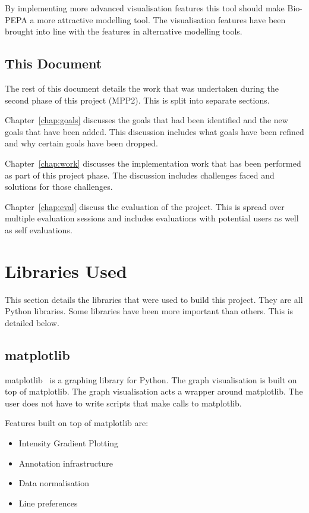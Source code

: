 By implementing more advanced visualisation features this tool should make Bio-PEPA a more attractive modelling tool. The visualisation features have been brought into line with the features in alternative modelling tools.

\subsection{This Document}

The rest of this document details the work that was undertaken during the second phase of this project (MPP2).  This is split into separate sections.

Chapter~\ref{chap:goals} discusses the goals that had been identified and the new goals that have been added.  This discussion includes what goals have been refined and why certain goals have been dropped.

Chapter~\ref{chap:work} discusses the implementation work that has been performed as part of this project phase.  The discussion includes challenges faced and solutions for those challenges.

Chapter~\ref{chap:eval} discuss the evaluation of the project.  This is spread over multiple evaluation sessions and includes evaluations with potential users as well as self evaluations.

\section{Libraries Used}

This section details the libraries that were used to build this project.  They are all Python libraries.  Some libraries have been more important than others.  This is detailed below.

\subsection{matplotlib}

matplotlib~\cite{mpl} is a graphing library for Python.  The graph visualisation is built on top of matplotlib.  The graph visualisation acts a wrapper around matplotlib.  The user does not have to write scripts that make calls to matplotlib.

Features built on top of matplotlib are:
\begin{itemize}
\item Intensity Gradient Plotting
\item Annotation infrastructure
\item Data normalisation
\item Line preferences
\end{itemize}

